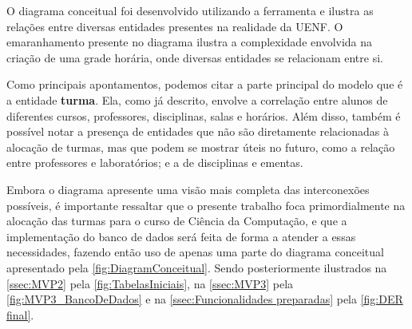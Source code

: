 O diagrama conceitual foi desenvolvido utilizando a ferramenta  e ilustra as relações entre diversas entidades presentes na realidade da UENF. O emaranhamento presente no diagrama ilustra a complexidade envolvida na criação de uma grade horária, onde diversas entidades se relacionam entre si.

Como principais apontamentos, podemos citar a parte principal do modelo que é a entidade \textbf{turma}. Ela, como já descrito, envolve a correlação entre alunos de diferentes cursos, professores, disciplinas, salas e horários. Além disso, também é possível notar a presença de entidades que não são diretamente relacionadas à alocação de turmas, mas que podem se mostrar úteis no futuro, como a relação entre professores e laboratórios; e a de disciplinas e ementas.

Embora o diagrama apresente uma visão mais completa das interconexões possíveis, é importante ressaltar que o presente trabalho foca primordialmente na alocação das turmas para o curso de Ciência da Computação, e que a implementação do banco de dados será feita de forma a atender a essas necessidades, fazendo então uso de apenas uma parte do diagrama conceitual apresentado pela \autoref{fig:DiagramConceitual}.
Sendo posteriormente ilustrados na \autoref{ssec:MVP2} pela \autoref{fig:TabelasIniciais}, na \autoref{ssec:MVP3} pela \autoref{fig:MVP3_BancoDeDados} e na \autoref{ssec:Funcionalidades preparadas} pela \autoref{fig:DER final}.





